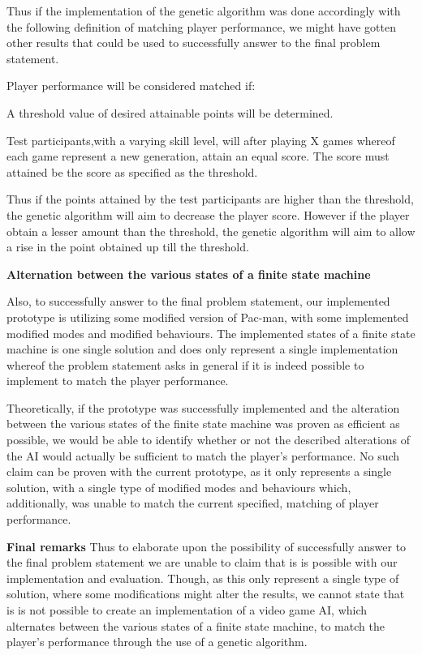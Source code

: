 Thus if the implementation of the genetic algorithm was done accordingly with the following definition of matching player performance, we might have gotten other results that could be used to successfully answer to the final problem statement.

Player performance will be considered matched if:

A threshold value of desired attainable points will be determined.

Test participants,with a varying skill level, will after playing X games whereof each game represent a new generation, attain an equal score. The score must attained be the score as specified as the threshold.

 Thus if the points attained by the test participants are higher than the threshold, the genetic algorithm will aim to decrease the player score. However if the player obtain a lesser amount than the threshold, the genetic algorithm will aim to allow a rise in the point obtained up till the threshold.
 
 \textbf{Alternation between the various states of a finite state machine}
 
Also, to successfully answer to the final problem statement, our implemented prototype is utilizing some modified version of Pac-man, with some implemented modified modes and modified behaviours. The implemented states of a finite state machine is one single solution and does only represent a single implementation whereof the problem statement asks in general if it is indeed possible to implement to match the player performance.
 
Theoretically, if the prototype was successfully implemented and the alteration between the various states of the finite state machine was proven as efficient as possible, we would be able to identify whether or not the described alterations of the AI would actually be sufficient to match the player's performance. No such claim can be proven with the current prototype, as it only represents a single solution, with a single type of modified modes and behaviours which, additionally, was unable to match the current specified, matching of player performance.
 

\textbf{Final remarks}
Thus to elaborate upon the possibility of successfully answer to the final problem statement we are unable to claim that is is possible with our implementation and evaluation. Though, as this only represent a single type of solution, where some modifications might alter the results, we cannot state that is is not possible to create an implementation of a video game AI, which alternates between the various states of a finite state machine, to match the player's performance through the use of a genetic algorithm.

